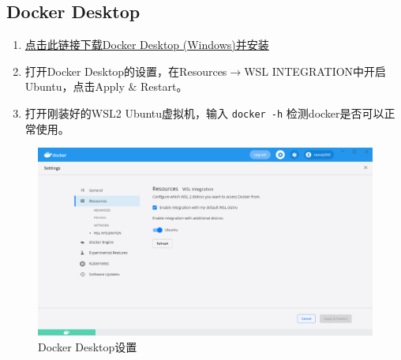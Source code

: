\documentclass[UTF8,zhmap=true,fontset=none,zihao=-4,heading=false,scheme=chinese]{ctexart}
\begin{document}
\subsection{Docker Desktop}
\begin{enumerate}
    \item \href{https://desktop.docker.com/win/main/amd64/Docker%20Desktop%20Installer.exe?utm_source=docker&utm_medium=webreferral&utm_campaign=dd-smartbutton&utm_location=module}{点击此链接下载Docker Desktop (Windows)并安装}
    \item 打开Docker Desktop的设置，在Resources\(\rightarrow\)WSL INTEGRATION中开启Ubuntu，点击Apply \& Restart。
    \item 打开刚装好的WSL2 Ubuntu虚拟机，输入 \verb|docker -h| 检测docker是否可以正常使用。
\end{enumerate}
\begin{figure}
    \centering
    \includegraphics[width=\linewidth]{Docker-Desktop.png}
    \caption{Docker Desktop设置}
\end{figure}
\end{document}
